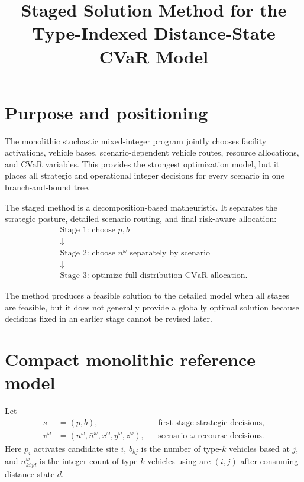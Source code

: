 \documentclass[11pt]{article}
\title{Staged Solution Method for the Type-Indexed Distance-State CVaR Model}
\author{}
\date{}
\begin{document}
\maketitle

\section{Purpose and positioning}

The monolithic stochastic mixed-integer program jointly chooses facility
activations, vehicle bases, scenario-dependent vehicle routes, resource
allocations, and CVaR variables.  This provides the strongest optimization
model, but it places all strategic and operational integer decisions for every
scenario in one branch-and-bound tree.

The staged method is a decomposition-based matheuristic.  It separates the
strategic posture, detailed scenario routing, and final risk-aware allocation:
\begin{equation*}
\begin{gathered}
\boxed{\text{Stage 1: choose }p,b}\\[2mm]
\downarrow\\[2mm]
\boxed{\text{Stage 2: choose }n^\omega\text{ separately by scenario}}\\[2mm]
\downarrow\\[2mm]
\boxed{\text{Stage 3: optimize full-distribution CVaR allocation}}.
\end{gathered}
\end{equation*}

The method produces a feasible solution to the detailed model when all stages
are feasible, but it does not generally provide a globally optimal solution
because decisions fixed in an earlier stage cannot be revised later.

\section{Compact monolithic reference model}

Let
\begin{align*}
s&=(p,b), &&\text{first-stage strategic decisions},\\
v^\omega&=(n^\omega,\bar n^\omega,x^\omega,y^\omega,z^\omega),
&&\text{scenario-$\omega$ recourse decisions}.
\end{align*}
Here $p_i$ activates candidate site $i$, $b_{kj}$ is the number of type-$k$
vehicles based at $j$, and $n^\omega_{kijd}$ is the integer count of type-$k$
vehicles using arc $(i,j)$ after consuming distance state $d$.
\end{document}
